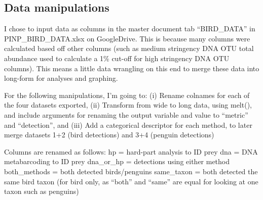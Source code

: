 \documentclass[]{article}
\newenvironment{Shaded}{\begin{snugshade}}{\end{snugshade}}
\newcommand{\KeywordTok}[1]{\textcolor[rgb]{0.13,0.29,0.53}{\textbf{#1}}}
\newcommand{\DataTypeTok}[1]{\textcolor[rgb]{0.13,0.29,0.53}{#1}}
\newcommand{\StringTok}[1]{\textcolor[rgb]{0.31,0.60,0.02}{#1}}
\newcommand{\CommentTok}[1]{\textcolor[rgb]{0.56,0.35,0.01}{\textit{#1}}}
\newcommand{\OtherTok}[1]{\textcolor[rgb]{0.56,0.35,0.01}{#1}}
\newcommand{\NormalTok}[1]{#1}
\begin{document}
\begin{Shaded}
\end{Shaded}

\subsection{Data manipulations}\label{data-manipulations}

I chose to input data as columns in the master document tab
``BIRD\_DATA'' in PINP\_BIRD\_DATA.xlsx on GoogleDrive. This is because
many columns were calculated based off other columns (such as medium
stringency DNA OTU total abundance used to calculate a 1\% cut-off for
high stringency DNA OTU columns). This means a little data wrangling on
this end to merge these data into long-form for analyses and graphing.

For the following manipulations, I'm going to: (i) Rename colnames for
each of the four datasets exported, (ii) Transform from wide to long
data, using melt(), and include arguments for renaming the output
variable and value to ``metric'' and ``detection'', and (iii) Add a
categorical descriptor for each method, to later merge datasets 1+2
(bird detections) and 3+4 (penguin detections)

Columns are renamed as follows: hp = hard-part analysis to ID prey dna =
DNA metabarcoding to ID prey dna\_or\_hp = detections using either
method both\_methods = both detected birds/penguins same\_taxon = both
detected the same bird taxon (for bird only, as ``both'' and ``same''
are equal for looking at one taxon such as penguins)
\end{document}
